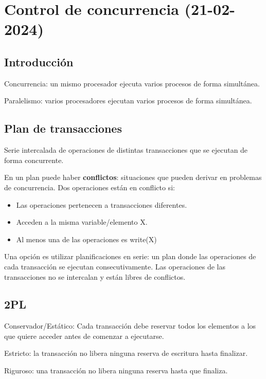 \documentclass{article}
\begin{document}
\section{Control de concurrencia (21-02-2024)}
\subsection{Introducción}
\begin{theorem}
Concurrencia: un mismo procesador ejecuta varios procesos de forma simultánea.
\end{theorem}
\begin{theorem}
Paralelismo: varios procesadores ejecutan varios procesos de forma simultánea. 
\end{theorem}
\subsection{Plan de transacciones}
\begin{theorem}
Serie intercalada de operaciones de distintas transacciones que se ejecutan de forma concurrente. 
\end{theorem}
En un plan puede haber \textbf{conflictos}: situaciones que pueden derivar en problemas de concurrencia. 
Dos operaciones están en conflicto si:
\begin{itemize}
	\item Las operaciones pertenecen a transacciones diferentes.
	\item Acceden a la misma variable/elemento X.
	\item Al menos una de las operaciones es write(X)
\end{itemize}
Una opción es utilizar planificaciones en serie: un plan donde las operaciones de cada transacción se ejecutan consecutivamente. Las operaciones de las transacciones no se intercalan y están libres de conflictos. 
\subsection{2PL}
\begin{theorem}
Conservador/Estático: Cada transacción debe reservar todos los elementos a los que quiere acceder antes de comenzar a ejecutarse.
\end{theorem}
\begin{theorem}
Estricto: la transacción no libera ninguna reserva de escritura hasta finalizar.
\end{theorem}
\begin{theorem}
Riguroso: una transacción no libera ninguna reserva hasta que finaliza.
\end{theorem}
\end{document}
